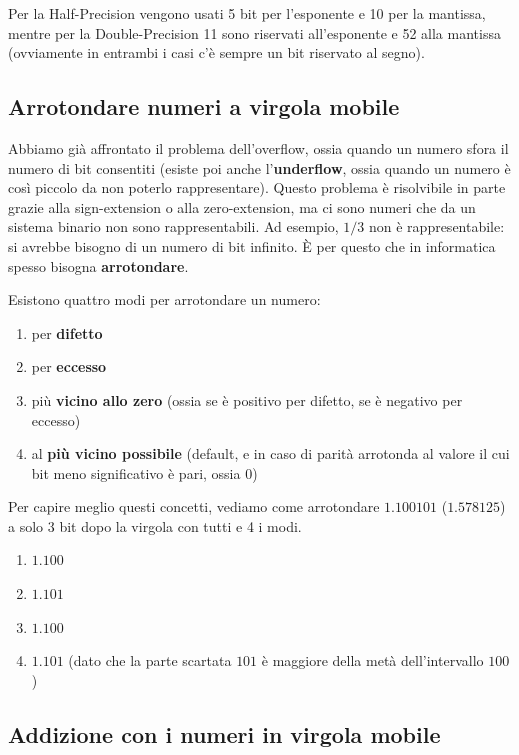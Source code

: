 \documentclass[11pt, a4paper, titlepage, oneside]{scrbook}
\begin{document}
Per la Half-Precision vengono usati 5 bit per l'esponente e 10 per la mantissa, mentre per la Double-Precision 11 sono riservati all'esponente e 52 alla mantissa (ovviamente in entrambi i casi c'è sempre un bit riservato al segno).

\subsection{Arrotondare numeri a virgola mobile}

Abbiamo già affrontato il problema dell'overflow, ossia quando un numero sfora il numero di bit consentiti (esiste poi anche l'\textbf{underflow}, ossia quando un numero è così piccolo da non poterlo rappresentare). Questo problema è risolvibile in parte grazie alla sign-extension o alla zero-extension, ma ci sono numeri che da un sistema binario non sono rappresentabili. Ad esempio, $1/3$ non è rappresentabile: si avrebbe bisogno di un numero di bit infinito. È per questo che in informatica spesso bisogna \textbf{arrotondare}.

\begin{Proprieta}[Arrotondare]
\label{prop-arrotondare}
Esistono quattro modi per arrotondare un numero:
\begin{enumerate}
    \item per \textbf{difetto}
    \item per \textbf{eccesso}
    \item più \textbf{vicino allo zero} (ossia se è positivo per difetto, se è negativo per eccesso)
    \item al \textbf{più vicino possibile} (default, e in caso di parità arrotonda al valore il cui bit meno significativo è pari, ossia 0)
\end{enumerate}
\end{Proprieta}

Per capire meglio questi concetti, vediamo come arrotondare $1.100101$ ($1.578125$) a solo 3 bit dopo la virgola con tutti e 4 i modi.

\begin{enumerate}
    \item $\bm{1.100}$
    \item $\bm{1.101}$
    \item $\bm{1.100}$
    \item $\bm{1.101}$ (dato che la parte scartata $101$ è maggiore della metà dell'intervallo $100$)
\end{enumerate}

\subsection{Addizione con i numeri in virgola mobile}
\end{document}
